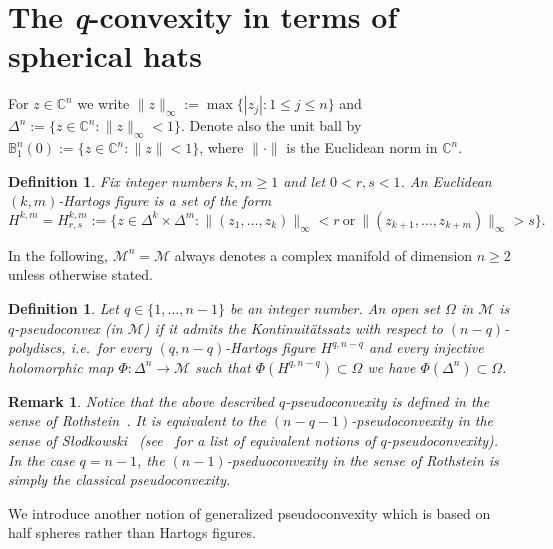 \documentclass[11pt,a4paper]{article}
\newtheorem{rem}[lem]{Remark}
\newtheorem{defn}[lem]{Definition}
\newcommand{\BB}{\mathbb{B}}
\newcommand{\CC}{\mathbb{C}}
\newcommand{\Mcal}{\mathcal{M}}
\begin{document}
\section{The \textit{q}-convexity in terms of spherical hats}

For $z\in\CC^n$ we write $\|z\|_\infty:=\max\{|z_j|:1\leq j\leq n\}$ and $\Delta^n:=\{z \in \CC^n : \|z\|_\infty <1\}$. Denote also the unit ball by $\BB_1^n(0):=\{z \in \CC^n : \|z\|<1\}$, where $\|\cdot\|$ is the Euclidean norm in $\CC^n$.

\begin{defn} Fix integer numbers $k,m \geq 1$ and let $0 < r,s < 1$. An Euclidean $(k,m)$-\emph{Hartogs figure} is a set of the form 
\[
H^{k,m}=H^{k,m}_{r,s}:=\{z \in \Delta^k\times\Delta^{m}: \|(z_1,\ldots,z_k)\|_\infty < r \ \mbox{or} \ \|(z_{k+1},\ldots,z_{k+m})\|_\infty > s\}.
\]
\end{defn}

In the following, $\Mcal^n=\Mcal$ always denotes a complex manifold of dimension $n \geq 2$ unless otherwise stated.

\begin{defn} Let $q \in \{1,\ldots,n-1\}$ be an integer number. An open set $\Omega$ in $\Mcal$ is \emph{$q$-pseudoconvex} (in $\Mcal$) if it admits the \emph{Kontinuit\"atssatz} with respect to $(n-q)$-polydiscs, i.e.~for every $(q,n-q)$-Hartogs figure $H^{q,n-q}$ and every injective holomorphic map $\Phi:\Delta^n\to\Mcal$ such that $\Phi(H^{q,n-q}) \subset \Omega$ we have $\Phi(\Delta^n) \subset \Omega$.
\end{defn}


\begin{rem} Notice that the above described $q$-pseudoconvexity is defined in the sense of Rothstein~\cite{Ro}. It is equivalent to the $(n{-}q{-}1)$-pseudoconvexity in the sense of S\l{}odkowski~\cite{Sl} (see~\cite{Paw} for a list of equivalent notions of $q$-pseudoconvexity). In the case $q=n-1$, the $(n-1)$-pseduoconvexity in the sense of Rothstein is simply the classical pseudoconvexity.
\end{rem}

We introduce another notion of generalized pseudoconvexity which is based on half spheres rather than Hartogs figures.
\end{document}
